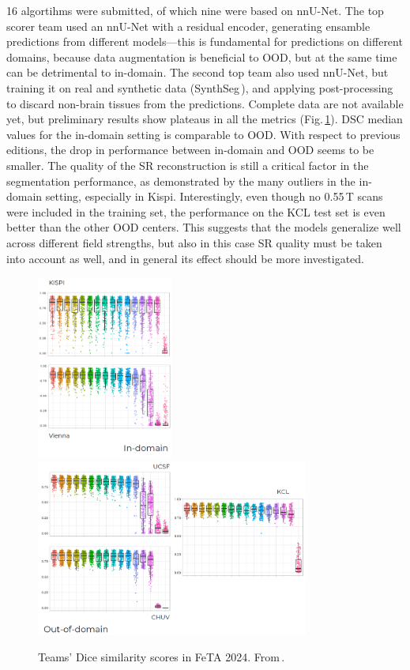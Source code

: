 16 algortihms were submitted, of which nine were based on nnU-Net. The top scorer team used an nnU-Net with a residual encoder, generating ensamble predictions from different models---this is fundamental for predictions on different domains, because data augmentation is beneficial to OOD, but at the same time can be detrimental to in-domain. The second top team also used nnU-Net, but training it on real and synthetic data (SynthSeg\,\cite{Billot2023}), and applying post-processing to discard non-brain tissues from the predictions. Complete data are not available yet, but preliminary results show plateaus in all the metrics (Fig.\,\ref{fig:FeTA2024_results}). DSC median values for the in-domain setting is comparable to OOD. With respect to previous editions, the drop in performance between in-domain and OOD seems to be smaller. The quality of the SR reconstruction is still a critical factor in the segmentation performance, as demonstrated by the many outliers in the in-domain setting, especially in Kispi. Interestingly, even though no 0.55\,T scans were included in the training set, the performance on the KCL test set is even better than the other OOD centers. This suggests that the models generalize well across different field strengths, but also in this case SR quality must be taken into account as well, and in general its effect should be more investigated.

\begin{figure}[htbp]
    \centering
    \includegraphics[width=0.4\textwidth]{figures/feta24_in-domain.png}
    \includegraphics[width=0.8\textwidth]{figures/feta24_out-of-domain.png}
    \caption{Teams' Dice similarity scores in FeTA 2024. From\,\cite{FeTA2024}.}
    \label{fig:FeTA2024_results}
\end{figure}
